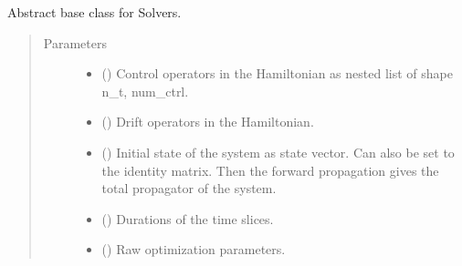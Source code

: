 \documentclass[letterpaper,10pt,english]{sphinxmanual}
\begin{document}
\begin{fulllineitems}
Abstract base class for Solvers.
\begin{quote}\begin{description}
\item[{Parameters}] \leavevmode\begin{itemize}
\item {} 
 (\sphinxstyleliteralemphasis{\sphinxupquote{{[}}}\sphinxstyleliteralemphasis{\sphinxupquote{{]}}}\sphinxstyleliteralemphasis{\sphinxupquote{, }}) \textendash{} Control operators in the Hamiltonian as nested list of
shape n\_t, num\_ctrl.

\item {} 
 (\sphinxstyleliteralemphasis{\sphinxupquote{{[}}}\sphinxstyleliteralemphasis{\sphinxupquote{{]}}}\sphinxstyleliteralemphasis{\sphinxupquote{, }}) \textendash{} Drift operators in the Hamiltonian.

\item {} 
 () \textendash{} Initial state of the system as state vector. Can also be set to the
identity matrix. Then the forward propagation gives the total
propagator of the system.

\item {} 
 (\sphinxstyleliteralemphasis{\sphinxupquote{, }}\sphinxstyleliteralemphasis{\sphinxupquote{ (}}\sphinxstyleliteralemphasis{\sphinxupquote{, }}\sphinxstyleliteralemphasis{\sphinxupquote{)}}) \textendash{} Durations of the time slices.

\item {} 
 (\sphinxstyleliteralemphasis{\sphinxupquote{, }}\sphinxstyleliteralemphasis{\sphinxupquote{ (}}\sphinxstyleliteralemphasis{\sphinxupquote{, }}\sphinxstyleliteralemphasis{\sphinxupquote{)}}\sphinxstyleliteralemphasis{\sphinxupquote{, }}) \textendash{} Raw optimization parameters.


\end{itemize}
\end{description}
\end{quote}
\end{fulllineitems}
\end{document}
